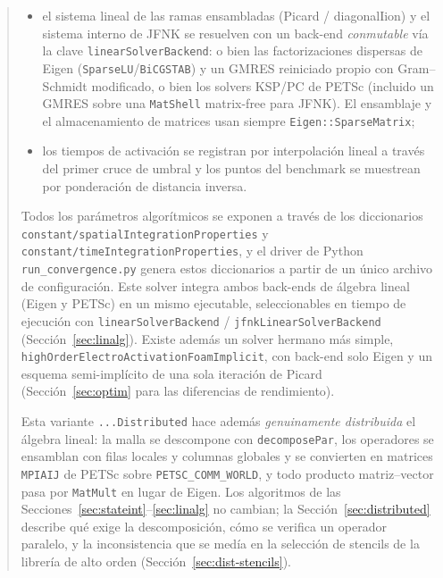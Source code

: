 \documentclass[11pt,a4paper]{article}
\newcommand{\code}[1]{\texttt{\small #1}}
\newcommand{\Iion}{I_{\mathrm{ion}}}
\begin{document}
\begin{abstract}
\begin{itemize}
fijo de Picard, una linealización diagonal de $\Iion$, o un método Jacobian-Free
Newton--Krylov (JFNK) con búsqueda de línea (\emph{line search}) de retroceso de
Armijo, valor inicial por extrapolación lineal y un \emph{clamp} de bracket físico
sobre la entrada al ODE iónico;
\item el sistema lineal de las ramas ensambladas (Picard / diagonalIion) y el
sistema interno de JFNK se resuelven con un back-end \emph{conmutable} vía la clave
\code{linearSolverBackend}: o bien las factorizaciones dispersas de Eigen
(\code{SparseLU}/\code{BiCGSTAB}) y un GMRES reiniciado propio con Gram--Schmidt
modificado, o bien los solvers KSP/PC de PETSc (incluido un GMRES sobre una
\code{MatShell} matrix-free para JFNK). El ensamblaje y el almacenamiento de
matrices usan siempre \code{Eigen::SparseMatrix};
\item los tiempos de activación se registran por interpolación lineal a
través del primer cruce de umbral y los puntos del benchmark se muestrean por
ponderación de distancia inversa.
\end{itemize}
 
Todos los parámetros algorítmicos se exponen a
través de los diccionarios \code{constant/spatialIntegrationProperties} y
\code{constant/timeIntegrationProperties}, y el driver de Python
\code{run\_convergence.py} genera estos diccionarios a partir de un único archivo
de configuración. Este solver integra ambos back-ends de álgebra lineal (Eigen y
PETSc) en un mismo ejecutable, seleccionables en tiempo de ejecución con
\code{linearSolverBackend} / \code{jfnkLinearSolverBackend}
(Sección~\ref{sec:linalg}). Existe además un solver hermano más simple,
\code{highOrderElectroActivationFoamImplicit}, con back-end solo Eigen y un esquema
semi-implícito de una sola iteración de Picard (Sección~\ref{sec:optim} para las
diferencias de rendimiento).

Esta variante \code{...Distributed} hace además \emph{genuinamente distribuida}
el álgebra lineal: la malla se descompone con \code{decomposePar}, los operadores
se ensamblan con filas locales y columnas globales y se convierten en matrices
\code{MPIAIJ} de PETSc sobre \code{PETSC\_COMM\_WORLD}, y todo producto
matriz--vector pasa por \code{MatMult} en lugar de Eigen. Los algoritmos de las
Secciones~\ref{sec:stateint}--\ref{sec:linalg} no cambian; la
Sección~\ref{sec:distributed} describe qué exige la descomposición, cómo se
verifica un operador paralelo, y la inconsistencia que se medía en la selección
de stencils de la librería de alto orden (Sección~\ref{sec:dist-stencils}).


\end{abstract}
\end{document}
